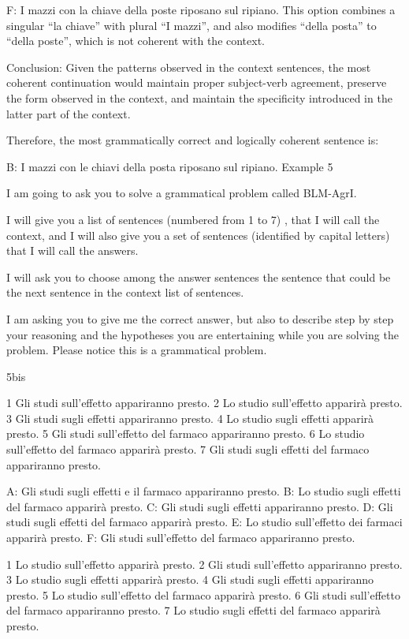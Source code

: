 F: I mazzi con la chiave della poste riposano sul ripiano.
This option combines a singular “la chiave” with plural “I mazzi”, and also modifies “della posta” to “della poste”, which is not coherent with the context.

Conclusion:
Given the patterns observed in the context sentences, the most coherent continuation would maintain proper subject-verb agreement, preserve the form observed in the context, and maintain the specificity introduced in the latter part of the context.

Therefore, the most grammatically correct and logically coherent sentence is:

B: I mazzi con le chiavi della posta riposano sul ripiano.
Example 5

I am going to ask you to solve a grammatical problem called BLM-AgrI.  

I will give you a list of sentences (numbered from 1 to 7) , that I will call the context, and I will also give you a set of sentences (identified by capital letters) that I will call  the answers. 

I will ask you to choose among the answer sentences the sentence that could be the next sentence in the context list of sentences.

I am asking you to give me the correct answer, but also to describe step by step  your reasoning and the hypotheses you are entertaining while you are solving the problem. Please notice this is a grammatical problem.

5bis 

1 Gli studi sull'effetto appariranno presto.
2 Lo studio sull'effetto apparirà presto.
3 Gli studi sugli effetti appariranno presto.
4 Lo studio sugli effetti apparirà presto.
5 Gli studi sull'effetto del farmaco appariranno presto.
6 Lo studio sull'effetto del farmaco apparirà presto.
7 Gli studi sugli effetti del farmaco appariranno presto.

A: Gli studi sugli effetti e il farmaco appariranno presto.
B: Lo studio sugli effetti del farmaco apparirà presto.
C: Gli studi sugli effetti appariranno presto.
D: Gli studi sugli effetti del farmaco apparirà presto.
E: Lo studio sull'effetto dei farmaci apparirà presto.
F: Gli studi sull'effetto del farmaco appariranno presto.


1 Lo studio sull'effetto apparirà presto.
2 Gli studi sull'effetto appariranno presto.
3 Lo studio sugli effetti apparirà presto.
4 Gli studi sugli effetti appariranno presto.
5 Lo studio sull'effetto del farmaco apparirà presto.
6 Gli studi sull'effetto del farmaco appariranno presto.
7 Lo studio sugli effetti del farmaco apparirà presto.


